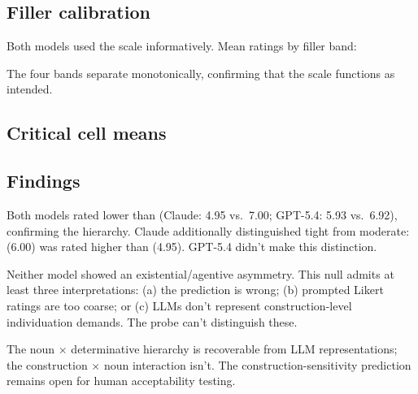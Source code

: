 \documentclass[12pt,a4paper]{article}
\begin{document}
\subsection*{Filler calibration}

Both models used the scale informatively. Mean ratings by filler band:



\noindent The four bands separate monotonically, confirming that the scale functions as intended.

\subsection*{Critical cell means}



\subsection*{Findings}



Both models rated  lower than  (Claude: 4.95 vs.\ 7.00; GPT-5.4: 5.93 vs.\ 6.92), confirming the hierarchy. Claude additionally distinguished tight from moderate:  (6.00) was rated higher than  (4.95). GPT-5.4 didn't make this distinction.

Neither model showed an existential/agentive asymmetry. This null admits at least three interpretations: (a) the prediction is wrong; (b) prompted Likert ratings are too coarse; or (c) LLMs don't represent construction-level individuation demands. The probe can't distinguish these.

The noun $\times$ determinative hierarchy is recoverable from LLM representations; the construction $\times$ noun interaction isn't. The construction-sensitivity prediction remains open for human acceptability testing.

\clearpage
\printbibliography
\end{document}
